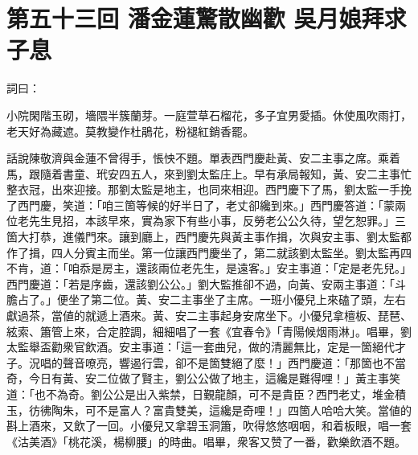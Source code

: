 
\chapter*{第五十三回 潘金蓮驚散幽歡 吳月娘拜求子息}


詞曰：

\begin{myquote}
小院閑階玉砌，墻隈半簇蘭芽。一庭萱草石榴花，多子宜男愛插。休使風吹雨打，老天好為藏遮。莫教變作杜鵑花，粉褪紅銷香罷。

\end{myquote}

話說陳敬濟與金蓮不曾得手，悵怏不題。單表西門慶赴黃、安二主事之席。乘着馬，跟隨着書童、玳安四五人，來到劉太監庄上。早有承局報知，黃、安二主事忙整衣冠，出來迎接。那劉太監是地主，也同來相迎。西門慶下了馬，劉太監一手挽了西門慶，笑道：「咱三箇等候的好半日了，老丈卻纔到來。」西門慶答道：「蒙兩位老先生見招，本該早來，實為家下有些小事，反勞老公公久待，望乞恕罪。」三箇大打恭，進儀門來。讓到廳上，西門慶先與黃主事作揖，次與安主事、劉太監都作了揖，四人分賓主而坐。第一位讓西門慶坐了，第二就該劉太監坐。劉太監再四不肯，道：「咱忝是房主，還該兩位老先生，是遠客。」安主事道：「定是老先兒。」西門慶道：「若是序齒，還該劉公公。」劉大監推卻不過，向黃、安兩主事道：「斗膽占了。」便坐了第二位。黃、安二主事坐了主席。一班小優兒上來磕了頭，左右獻過茶，當値的就遞上酒來。黃、安二主事起身安席坐下。小優兒拿檀板、琵琶、絃索、簫管上來，合定腔調，細細唱了一套《宜春令》「青陽候烟雨淋」。唱畢，劉太監舉盃勸衆官飲酒。安主事道：「這一套曲兒，做的清麗無比，定是一箇絕代才子。況唱的聲音嘹亮，響遏行雲，卻不是箇雙絕了麼！」西門慶道：「那箇也不當奇，今日有黃、安二位做了賢主，劉公公做了地主，這纔是難得哩！」黃主事笑道：「也不為奇。劉公公是出入紫禁，日覲龍顏，可不是貴臣？西門老丈，堆金積玉，彷彿陶朱，可不是富人？富貴雙美，這纔是奇哩！」{}四箇人哈哈大笑。當値的斟上酒來，又飲了一回。小優兒又拿碧玉洞簫，吹得悠悠咽咽，和着板眼，唱一套《沽美酒》「桃花溪，楊柳腰」的時曲。唱畢，衆客又赞了一番，歡樂飲酒不題。

